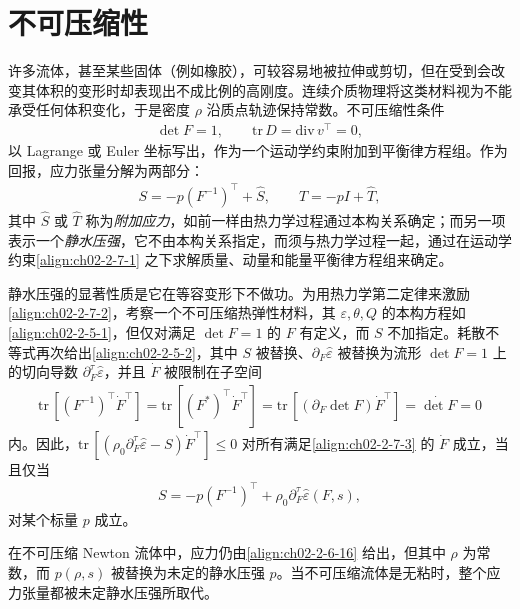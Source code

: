 \documentclass[../../main.tex]{subfiles}
\begin{document}
\section{不可压缩性}\label{section:ch02-不可压缩性}

许多流体，甚至某些固体（例如橡胶），可较容易地被拉伸或剪切，但在受到会改变其体积的变形时却表现出不成比例的高刚度。连续介质物理将这类材料视为不能承受任何体积变化，于是密度 $\rho$ 沿质点轨迹保持常数。不可压缩性条件
\begin{align}
\det F=1,\qquad\mathrm{tr}\,D=\mathrm{div}\,v^{\top}=0,
\label{align:ch02-2-7-1}
\end{align}
以 Lagrange 或 Euler 坐标写出，作为一个运动学约束附加到平衡律方程组。作为回报，应力张量分解为两部分：
\begin{align}
S=-p(F^{-1})^{\top}+\hat{S},\qquad T=-pI+\hat{T},
\label{align:ch02-2-7-2}
\end{align}
其中 $\hat{S}$ 或 $\hat{T}$ 称为\emph{附加应力}，如前一样由热力学过程通过本构关系确定；而另一项表示一个\emph{静水压强}，它不由本构关系指定，而须与热力学过程一起，通过在运动学约束\eqref{align:ch02-2-7-1} 之下求解质量、动量和能量平衡律方程组来确定。

静水压强的显著性质是它在等容变形下不做功。为用热力学第二定律来激励\eqref{align:ch02-2-7-2}，考察一个不可压缩热弹性材料，其 $\varepsilon,\theta,Q$ 的本构方程如\eqref{align:ch02-2-5-1}，但仅对满足 $\det F=1$ 的 $F$ 有定义，而 $S$ 不加指定。耗散不等式再次给出\eqref{align:ch02-2-5-2}，其中 $S$ 被替换、$\partial_{F}\hat{\varepsilon}$ 被替换为流形 $\det F=1$ 上的切向导数 $\partial^{\tau}_{F}\hat{\varepsilon}$，并且 $\dot{F}$ 被限制在子空间
\begin{align}
\mathrm{tr}\,[(F^{-1})^{\top}\dot{F}^{\top}]=\mathrm{tr}\,[(F^{*})^{\top}\dot{F}^{\top}]=\mathrm{tr}\,[(\partial_{F}\det F)\dot{F}^{\top}]=\dot{\det F}=0
\label{align:ch02-2-7-3}
\end{align}
内。因此，$\mathrm{tr}\,[(\rho_{0}\partial^{\tau}_{F}\hat{\varepsilon}-S)\dot{F}^{\top}]\leqslant 0$ 对所有满足\eqref{align:ch02-2-7-3} 的 $\dot{F}$ 成立，当且仅当
\begin{align}
S=-p(F^{-1})^{\top}+\rho_{0}\partial^{\tau}_{F}\hat{\varepsilon}(F,s),
\label{align:ch02-2-7-4}
\end{align}
对某个标量 $p$ 成立。

在不可压缩 Newton 流体中，应力仍由\eqref{align:ch02-2-6-16} 给出，但其中 $\rho$ 为常数，而 $p(\rho,s)$ 被替换为未定的静水压强 $p$。当不可压缩流体是无粘时，整个应力张量都被未定静水压强所取代。
\end{document}
